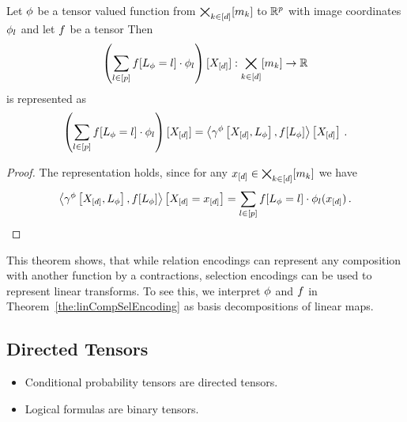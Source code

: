 \begin{theorem}\label{the:linCompSelEncoding}
	Let $\phi$ be a tensor valued function from $\bigtimes_{k\in[d]}[m_{k}]$ to $\mathbb{R}^{p}$ with image coordinates $\phi_l$ and let $f$ be a tensor
	Then
		\[ \left(\sum_{l\in[p]}f[L_{\phi}=l]\cdot \phi_l \right) [X_{[d]}] : \bigtimes_{k\in[d]}[m_{k}] \rightarrow \mathbb{R} \]
	is represented as
		\[ \left(\sum_{l\in[p]}f[L_{\phi}=l]\cdot \phi_l \right) [X_{[d]}]
		 = \left\langle \gamma^{\phi}\left[X_{[d]},L_{\phi}\right] , f[L_{\phi}]\right\rangle \left[ X_{[d]} \right] \, . \]
\end{theorem}
\begin{proof}
	The representation holds, since for any $x_{[d]}\in\bigtimes_{k\in[d]}[m_{k}]$ we have
	\begin{align*}
		\left\langle \gamma^{\phi}\left[X_{[d]},L_{\phi}\right] , f[L_{\phi}]\right\rangle \left[ X_{[d]}=x_{[d]} \right]  
		= \sum_{l\in[p]}f[L_{\phi}=l]\cdot\phi_l(x_{[d]}) \, .
	\end{align*} 
\end{proof}

This theorem shows, that while relation encodings can represent any composition with another function by a contractions, selection encodings can be used to represent linear transforms.
To see this, we interpret $\phi$ and $f$ in Theorem~\ref{the:linCompSelEncoding} as basis decompositions of linear maps.


\subsection{Directed Tensors}

\begin{itemize}
	\item Conditional probability tensors are directed tensors.
	\item Logical formulas are binary tensors.
\end{itemize}


